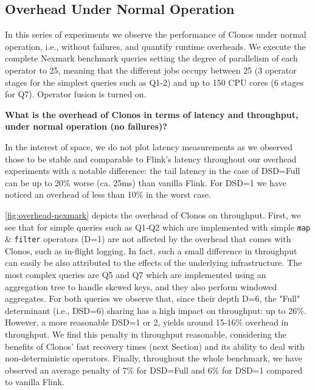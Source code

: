 \documentclass[sigconf]{acmart}
\begin{document}
\subsection{Overhead Under Normal Operation}
\label{sec:overhead}

In this series of experiments we observe the performance of Clonos under normal operation, i.e., without failures, and quantify runtime overheads. We execute the complete Nexmark benchmark queries setting the degree of parallelism of each operator to 25, meaning that the different jobs occupy between 25 (3 operator stages for the simplest queries such as Q1-2) and up to 150 CPU cores (6 stages for Q7). Operator fusion is turned on.



\vspace{3mm}
\begin{myframe}
\textbf{What is the overhead of Clonos in terms of latency and throughput, under normal operation (no failures)?}
\end{myframe}
\vspace{2mm}

In the interest of space, we do not plot latency measurements as we observed those to be stable and comparable to Flink's latency throughout our overhead experiments with a notable difference: the tail latency in the case of DSD=Full can be up to 20\% worse (ca. 25ms) than vanilla Flink. For DSD=1 we have noticed an overhead of less than 10\% in the worst case.

\autoref{fig:overhead-nexmark} depicts the overhead of Clonos on throughput. First, we see that for simple queries such as Q1-Q2 which are implemented with simple \texttt{map} \& \texttt{filter} operators (D=1) are not affected by the overhead that comes with Clonos, such as in-flight logging. In fact, such a small difference in throughput can easily be also attributed to the effects of the underlying infrastructure. The most complex queries are Q5 and Q7 which are implemented using an aggregation tree to handle skewed keys, and they also perform windowed aggregates. For both queries we observe that, since their depth D=6, the "Full" determinant (i.e., DSD=6) sharing has a high impact on throughput: up to 26\%. However, a more reasonable DSD=1 or 2, yields around 15-16\% overhead in throughput. We find this penalty in throughput reasonable, considering the benefits of Clonos' fast recovery times (next Section) and its ability to deal with non-deterministic operators. Finally, throughout the whole benchmark, we have observed an average penalty of 7\% for DSD=Full and 6\% for DSD=1 compared to vanilla Flink.
\end{document}
